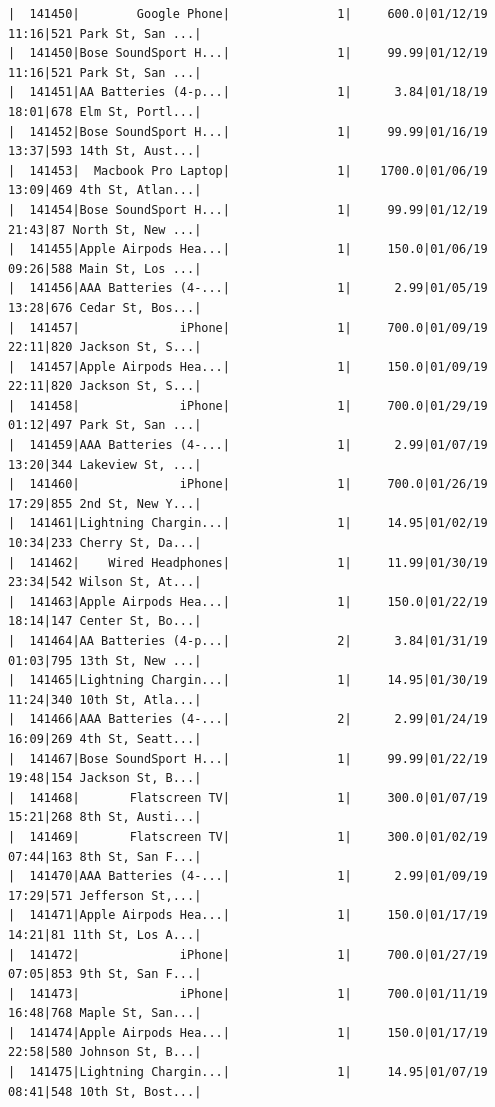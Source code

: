 \documentclass[
  letterpaper,
  DIV=11,
  numbers=noendperiod]{scrartcl}
\begin{document}
\begin{verbatim}
|  141450|        Google Phone|               1|     600.0|01/12/19 11:16|521 Park St, San ...|
|  141450|Bose SoundSport H...|               1|     99.99|01/12/19 11:16|521 Park St, San ...|
|  141451|AA Batteries (4-p...|               1|      3.84|01/18/19 18:01|678 Elm St, Portl...|
|  141452|Bose SoundSport H...|               1|     99.99|01/16/19 13:37|593 14th St, Aust...|
|  141453|  Macbook Pro Laptop|               1|    1700.0|01/06/19 13:09|469 4th St, Atlan...|
|  141454|Bose SoundSport H...|               1|     99.99|01/12/19 21:43|87 North St, New ...|
|  141455|Apple Airpods Hea...|               1|     150.0|01/06/19 09:26|588 Main St, Los ...|
|  141456|AAA Batteries (4-...|               1|      2.99|01/05/19 13:28|676 Cedar St, Bos...|
|  141457|              iPhone|               1|     700.0|01/09/19 22:11|820 Jackson St, S...|
|  141457|Apple Airpods Hea...|               1|     150.0|01/09/19 22:11|820 Jackson St, S...|
|  141458|              iPhone|               1|     700.0|01/29/19 01:12|497 Park St, San ...|
|  141459|AAA Batteries (4-...|               1|      2.99|01/07/19 13:20|344 Lakeview St, ...|
|  141460|              iPhone|               1|     700.0|01/26/19 17:29|855 2nd St, New Y...|
|  141461|Lightning Chargin...|               1|     14.95|01/02/19 10:34|233 Cherry St, Da...|
|  141462|    Wired Headphones|               1|     11.99|01/30/19 23:34|542 Wilson St, At...|
|  141463|Apple Airpods Hea...|               1|     150.0|01/22/19 18:14|147 Center St, Bo...|
|  141464|AA Batteries (4-p...|               2|      3.84|01/31/19 01:03|795 13th St, New ...|
|  141465|Lightning Chargin...|               1|     14.95|01/30/19 11:24|340 10th St, Atla...|
|  141466|AAA Batteries (4-...|               2|      2.99|01/24/19 16:09|269 4th St, Seatt...|
|  141467|Bose SoundSport H...|               1|     99.99|01/22/19 19:48|154 Jackson St, B...|
|  141468|       Flatscreen TV|               1|     300.0|01/07/19 15:21|268 8th St, Austi...|
|  141469|       Flatscreen TV|               1|     300.0|01/02/19 07:44|163 8th St, San F...|
|  141470|AAA Batteries (4-...|               1|      2.99|01/09/19 17:29|571 Jefferson St,...|
|  141471|Apple Airpods Hea...|               1|     150.0|01/17/19 14:21|81 11th St, Los A...|
|  141472|              iPhone|               1|     700.0|01/27/19 07:05|853 9th St, San F...|
|  141473|              iPhone|               1|     700.0|01/11/19 16:48|768 Maple St, San...|
|  141474|Apple Airpods Hea...|               1|     150.0|01/17/19 22:58|580 Johnson St, B...|
|  141475|Lightning Chargin...|               1|     14.95|01/07/19 08:41|548 10th St, Bost...|

\end{verbatim}
\end{document}
